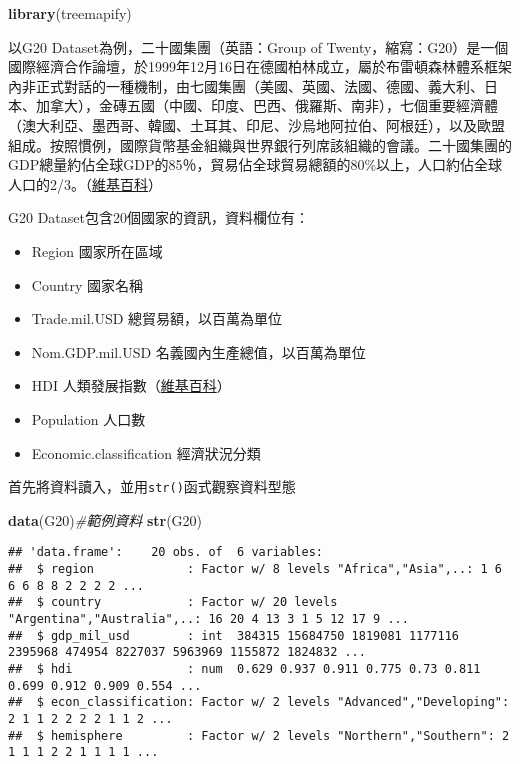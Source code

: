 \documentclass[
]{book}
\newenvironment{Shaded}{\begin{snugshade}}{\end{snugshade}}
\newcommand{\CommentTok}[1]{\textcolor[rgb]{0.56,0.35,0.01}{\textit{#1}}}
\newcommand{\KeywordTok}[1]{\textcolor[rgb]{0.13,0.29,0.53}{\textbf{#1}}}
\newcommand{\NormalTok}[1]{#1}
\providecommand{\tightlist}{%
  \setlength{\itemsep}{0pt}\setlength{\parskip}{0pt}}
\begin{document}
\begin{Shaded}
\begin{Highlighting}[]
\KeywordTok{library}\NormalTok{(treemapify)}
\end{Highlighting}
\end{Shaded}

以G20 Dataset為例，二十國集團（英語：Group of Twenty，縮寫：G20）是一個國際經濟合作論壇，於1999年12月16日在德國柏林成立，屬於布雷頓森林體系框架內非正式對話的一種機制，由七國集團（美國、英國、法國、德國、義大利、日本、加拿大），金磚五國（中國、印度、巴西、俄羅斯、南非），七個重要經濟體（澳大利亞、墨西哥、韓國、土耳其、印尼、沙烏地阿拉伯、阿根廷），以及歐盟組成。按照慣例，國際貨幣基金組織與世界銀行列席該組織的會議。二十國集團的GDP總量約佔全球GDP的85％，貿易佔全球貿易總額的80\%以上，人口約佔全球人口的2/3。（\href{https://en.wikipedia.org/wiki/G-20_major_economies}{維基百科}）

G20 Dataset包含20個國家的資訊，資料欄位有：

\begin{itemize}
\tightlist
\item
  Region 國家所在區域
\item
  Country 國家名稱
\item
  Trade.mil.USD 總貿易額，以百萬為單位
\item
  Nom.GDP.mil.USD 名義國內生產總值，以百萬為單位
\item
  HDI 人類發展指數（\href{https://zh.wikipedia.org/zh-tw/\%E4\%BA\%BA\%E7\%B1\%BB\%E5\%8F\%91\%E5\%B1\%95\%E6\%8C\%87\%E6\%95\%B0}{維基百科}）
\item
  Population 人口數
\item
  Economic.classification 經濟狀況分類
\end{itemize}

首先將資料讀入，並用\texttt{str()}函式觀察資料型態

\begin{Shaded}
\begin{Highlighting}[]
\KeywordTok{data}\NormalTok{(G20)}\CommentTok{#範例資料}
\KeywordTok{str}\NormalTok{(G20)}
\end{Highlighting}
\end{Shaded}

\begin{verbatim}
## 'data.frame':	20 obs. of  6 variables:
##  $ region             : Factor w/ 8 levels "Africa","Asia",..: 1 6 6 6 8 8 2 2 2 2 ...
##  $ country            : Factor w/ 20 levels "Argentina","Australia",..: 16 20 4 13 3 1 5 12 17 9 ...
##  $ gdp_mil_usd        : int  384315 15684750 1819081 1177116 2395968 474954 8227037 5963969 1155872 1824832 ...
##  $ hdi                : num  0.629 0.937 0.911 0.775 0.73 0.811 0.699 0.912 0.909 0.554 ...
##  $ econ_classification: Factor w/ 2 levels "Advanced","Developing": 2 1 1 2 2 2 2 1 1 2 ...
##  $ hemisphere         : Factor w/ 2 levels "Northern","Southern": 2 1 1 1 2 2 1 1 1 1 ...
\end{verbatim}
\end{document}
